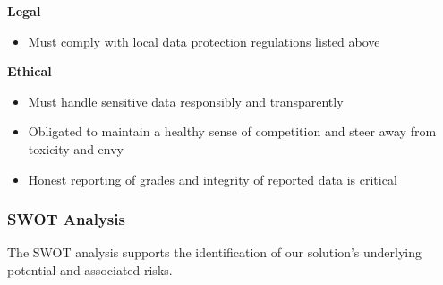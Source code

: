 \textbf{Legal}
\begin{itemize}
    \item Must comply with local data protection regulations listed above
\end{itemize}
\textbf{Ethical}
\begin{itemize}
    \item Must handle sensitive data responsibly and transparently
    \item Obligated to maintain a healthy sense of competition and steer away from toxicity and envy
    \item Honest reporting of grades and integrity of reported data is critical
\end{itemize}
\bigskip

\noindent \subsubsection{SWOT Analysis}
The SWOT analysis supports the identification of our solution's underlying potential and associated risks.
\smallskip

